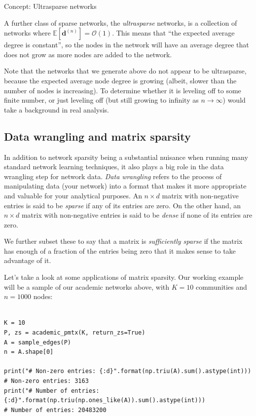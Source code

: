 \begin{floatingbox}[h]\caption{Concept: Ultrasparse networks}
A further class of sparse networks, the \textit{ultrasparse} networks, is a collection of networks where $\mathbb E[\mathbf d^{(n)}]= \mathcal O(1)$. This means that ``the expected average degree is constant'', so the nodes in the network will have an average degree that does not grow as more nodes are added to the network. 

Note that the networks that we generate above do not appear to be ultrasparse, because the expected average node degree is growing (albeit, slower than the number of nodes is increasing). To determine whether it is leveling off to some finite number, or just leveling off (but still growing to infinity as $n \rightarrow \infty$) would take a background in real analysis.
\end{floatingbox}

\subsection{Data wrangling and matrix sparsity}

In addition to network sparsity being a substantial nuisance when running many standard network learning techniques, it also plays a big role in the data wrangling step for network data. \textit{Data wrangling} refers to the process of manipulating data (your network) into a format that makes it more appropriate and valuable for your analytical purposes. An $n \times d$ matrix with non-negative entries is said to be \textit{sparse} if any of its entries are zero. On the other hand, an $n \times d$ matrix with non-negative entries is said to be \textit{dense} if none of its entries are zero.

We further subset these to say that a matrix is \textit{sufficiently sparse} if the matrix has enough of a fraction of the entries being zero that it makes sense to take advantage of it.

Let's take a look at some applications of matrix sparsity. Our working example will be a sample of our academic networks above, with $K = 10$ communities and $n=1000$ nodes:

\begin{lstlisting}[style=python]

K = 10
P, zs = academic_pmtx(K, return_zs=True)
A = sample_edges(P)
n = A.shape[0]

print("# Non-zero entries: {:d}".format(np.triu(A).sum().astype(int)))
# Non-zero entries: 3163
print("# Number of entries: {:d}".format(np.triu(np.ones_like(A)).sum().astype(int)))
# Number of entries: 20483200
\end{lstlisting}

